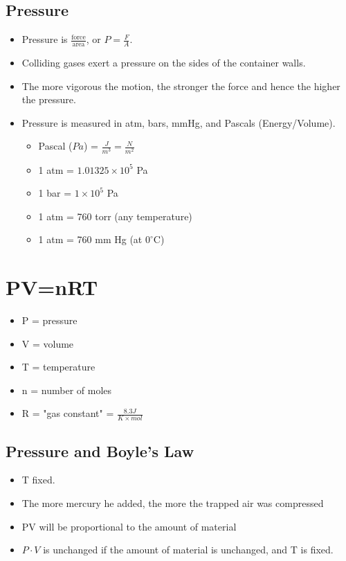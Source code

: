 \documentclass[10pt]{article}
\begin{document}
\subsection*{Pressure}
\begin{itemize}
    \item Pressure is $\frac{\text{force}}{\text{area}}$, or $P = \frac{F}{A}$.
    \item Colliding gases exert a pressure on the sides of the container walls.
    \item The more vigorous the motion, the stronger the force and hence the higher the pressure.
    \item Pressure is measured in atm, bars, mmHg, and Pascals (Energy/Volume).
    \begin{itemize}
        \item Pascal ($Pa$) = $\frac{J}{m^3} = \frac{N}{m^2}$
        \item 1 atm = $1.01325 \times 10^5$ Pa
        \item 1 bar = $1 \times 10^5$ Pa
        \item 1 atm = 760 torr (any temperature)
        \item 1 atm = 760 mm Hg (at $0^\circ$C)
    \end{itemize}
\end{itemize}

\section*{PV=nRT}
\begin{itemize}
    \item P = pressure
    \item V = volume
    \item T = temperature
    \item n = number of moles
    \item R = "gas constant" = $\frac{8.3 J}{K \times mol}$
\end{itemize}
\subsection*{Pressure and Boyle's Law}
\begin{itemize}
    \item T fixed.
    \item The more mercury he added, the more the trapped air was compressed
    \item PV will be proportional to the amount of material
    \item $P \cdot V$ is unchanged if the amount of material is unchanged, and T is fixed.
\end{itemize}
\end{document}
